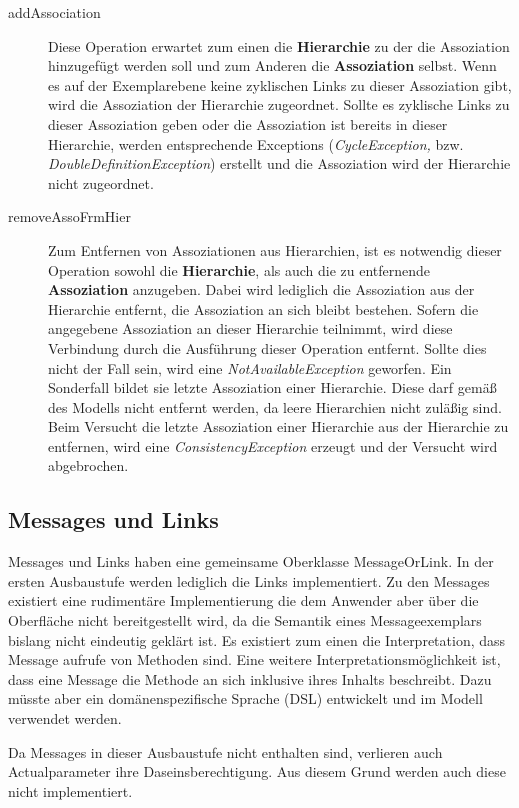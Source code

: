 \begin{description}
\item[addAssociation] Diese Operation erwartet zum einen die \textbf{Hierarchie} zu der die Assoziation hinzugefügt werden soll und zum Anderen die \textbf{Assoziation} selbst.
Wenn es auf der Exemplarebene keine zyklischen Links zu dieser Assoziation gibt, wird die Assoziation der Hierarchie zugeordnet. Sollte es zyklische Links
zu dieser Assoziation geben oder die Assoziation ist bereits in dieser Hierarchie, werden entsprechende Exceptions (\emph{CycleException,} bzw. \emph{DoubleDefinitionException}) 
erstellt und die Assoziation wird der Hierarchie nicht zugeordnet.
\item[removeAssoFrmHier] Zum Entfernen von Assoziationen aus Hierarchien, ist es notwendig dieser Operation sowohl die \textbf{Hierarchie}, als auch die zu entfernende 
\textbf{Assoziation} anzugeben. Dabei wird lediglich die Assoziation aus der Hierarchie entfernt, die Assoziation an sich bleibt bestehen. 
Sofern die angegebene Assoziation an dieser Hierarchie teilnimmt, wird diese Verbindung durch die Ausführung dieser Operation entfernt. 
Sollte dies nicht der Fall sein, wird eine \emph{NotAvailableException} geworfen. Ein Sonderfall bildet sie letzte Assoziation einer
Hierarchie. Diese darf gemäß des Modells nicht entfernt werden, da leere Hierarchien nicht zuläßig sind. Beim Versucht die letzte
Assoziation einer Hierarchie aus der Hierarchie zu entfernen, wird eine \emph{ConsistencyException} erzeugt und der Versucht wird abgebrochen. 
\end{description}


\newpage
\subsection{Messages und Links}

Messages und Links haben eine gemeinsame Oberklasse MessageOrLink. In der ersten Ausbaustufe werden lediglich die Links implementiert. Zu den Messages existiert eine rudimentäre
Implementierung die dem Anwender aber über die Oberfläche nicht bereitgestellt wird, da die 
Semantik eines Messageexemplars bislang nicht eindeutig geklärt ist.
Es existiert zum einen die Interpretation, dass Message aufrufe von Methoden sind. Eine weitere Interpretationsmöglichkeit ist, dass eine Message die Methode an sich inklusive ihres Inhalts beschreibt. 
Dazu müsste aber ein domänenspezifische Sprache (DSL) entwickelt und im Modell verwendet werden.

Da Messages in dieser Ausbaustufe nicht enthalten sind, verlieren auch Actualparameter ihre Daseinsberechtigung. Aus diesem Grund werden auch diese nicht implementiert.
 \vspace{15pt}

